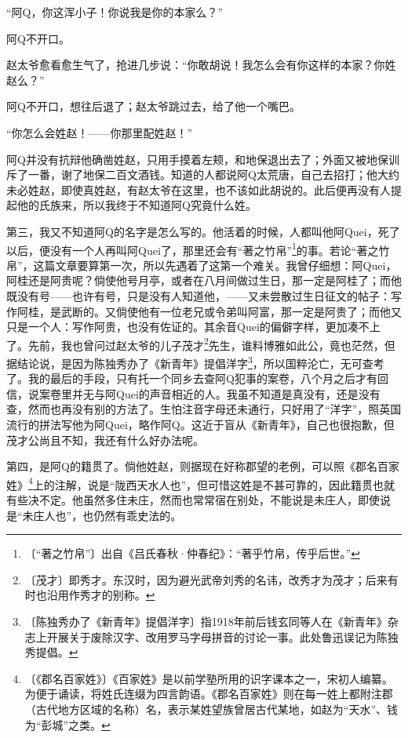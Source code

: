 \documentclass[12pt,UTF-8,openany]{ctexbook}
\begin{document}
\begin{normalsize}
    “阿Q，你这浑小子！你说我是你的本家么？”
    
    阿Q不开口。
    
    赵太爷愈看愈生气了，抢进几步说：“你敢胡说！我怎么会有你这样的本家？你姓赵么？”
    
    阿Q不开口，想往后退了；赵太爷跳过去，给了他一个嘴巴。
    
    “你怎么会姓赵！——你那里配姓赵！”
    
    阿Q并没有抗辩他确凿姓赵，只用手摸着左颊，和地保退出去了；外面又被地保训斥了一番，谢了地保二百文酒钱。知道的人都说阿Q太荒唐，自己去招打；他大约未必姓赵，即使真姓赵，有赵太爷在这里，也不该如此胡说的。此后便再没有人提起他的氏族来，所以我终于不知道阿Q究竟什么姓。
    
    第三，我又不知道阿Q的名字是怎么写的。他活着的时候，人都叫他阿Quei，死了以后，便没有一个人再叫阿Quei了，那里还会有“著之竹帛”\footnote{〔“著之竹帛”〕出自《吕氏春秋·仲春纪》：“著乎竹帛，传乎后世。”}的事。若论“著之竹帛”，这篇文章要算第一次，所以先遇着了这第一个难关。我曾仔细想：阿Quei，阿桂还是阿贵呢？倘使他号月亭，或者在八月间做过生日，那一定是阿桂了；而他既没有号——也许有号，只是没有人知道他，——又未尝散过生日征文的帖子：写作阿桂，是武断的。又倘使他有一位老兄或令弟叫阿富，那一定是阿贵了；而他又只是一个人：写作阿贵，也没有佐证的。其余音Quei的偏僻字样，更加凑不上了。先前，我也曾问过赵太爷的儿子茂才\footnote{〔茂才〕即秀才。东汉时，因为避光武帝刘秀的名讳，改秀才为茂才；后来有时也沿用作秀才的别称。}先生，谁料博雅如此公，竟也茫然，但据结论说，是因为陈独秀办了《新青年》提倡洋字\footnote{〔陈独秀办了《新青年》提倡洋字〕指1918年前后钱玄同等人在《新青年》杂志上开展关于废除汉字、改用罗马字母拼音的讨论一事。此处鲁迅误记为陈独秀提倡。}，所以国粹沦亡，无可查考了。我的最后的手段，只有托一个同乡去查阿Q犯事的案卷，八个月之后才有回信，说案卷里并无与阿Quei的声音相近的人。我虽不知道是真没有，还是没有查，然而也再没有别的方法了。生怕注音字母还未通行，只好用了“洋字”，照英国流行的拼法写他为阿Quei，略作阿Q。这近于盲从《新青年》，自己也很抱歉，但茂才公尚且不知，我还有什么好办法呢。
    
    第四，是阿Q的籍贯了。倘他姓赵，则据现在好称郡望的老例，可以照《郡名百家姓》\footnote{〔《郡名百家姓》〕《百家姓》是以前学塾所用的识字课本之一，宋初人编纂。为便于诵读，将姓氏连缀为四言韵语。《郡名百家姓》则在每一姓上都附注郡（古代地方区域的名称）名，表示某姓望族曾居古代某地，如赵为“天水”、钱为“彭城”之类。}上的注解，说是“陇西天水人也”，但可惜这姓是不甚可靠的，因此籍贯也就有些决不定。他虽然多住未庄，然而也常常宿在别处，不能说是未庄人，即使说是“未庄人也”，也仍然有乖史法的。
    

\end{normalsize}
\end{document}
